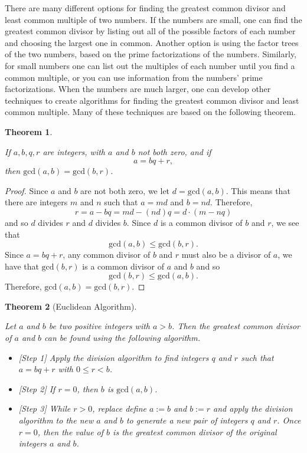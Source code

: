 \documentclass[
]{book}
\providecommand{\tightlist}{%
  \setlength{\itemsep}{0pt}\setlength{\parskip}{0pt}}
\newtheorem{theorem}{Theorem}[chapter]
\theoremstyle{definition}
\theoremstyle{definition}
\theoremstyle{definition}
\theoremstyle{definition}
\theoremstyle{remark}
\begin{document}
There are many different options for finding the greatest common divisor and least common multiple of two numbers. If the numbers are small, one can find the greatest common divisor by listing out all of the possible factors of each number and choosing the largest one in common. Another option is using the factor trees of the two numbers, based on the prime factorizations of the numbers. Similarly, for small numbers one can list out the multiples of each number until you find a common multiple, or you can use information from the numbers' prime factorizations. When the numbers are much larger, one can develop other techniques to create algorithms for finding the greatest common divisor and least common multiple. Many of these techniques are based on the following theorem.

\begin{theorem}
\protect\hypertarget{thm:integers-division-gcd}{}\label{thm:integers-division-gcd}

If \(a,b,q,r\) are integers, with \(a\) and \(b\) not both zero, and if \[a=bq+r,\] then \(\mathrm{gcd}(a,b)=\mathrm{gcd}(b,r)\).

\end{theorem}

\begin{proof}

Since \(a\) and \(b\) are not both zero, we let \(d=\mathrm{gcd}(a,b)\). This means that there are integers \(m\) and \(n\) such that \(a=md\) and \(b=nd\). Therefore,
\[r=a-bq=md-(nd)q = d\cdot (m-nq)\] and so \(d\) divides \(r\) and \(d\) divides \(b\). Since \(d\) is a common divisor of \(b\) and \(r\), we see that \[\mathrm{gcd}(a,b)\leq \mathrm{gcd}(b,r).\] Since \(a=bq+r\), any common divisor of \(b\) and \(r\) must also be a divisor of \(a\), we have that \(\mathrm{gcd}(b,r)\) is a common divisor of \(a\) and \(b\) and so \[\mathrm{gcd}(b,r) \leq \mathrm{gcd}(a,b).\] Therefore, \(\mathrm{gcd}(a,b)=\mathrm{gcd}(b,r)\).

\end{proof}

\begin{theorem}[Euclidean Algorithm]
\protect\hypertarget{thm:unlabeled-div-107}{}\label{thm:unlabeled-div-107}

Let \(a\) and \(b\) be two positive integers with \(a>b\). Then the greatest common divisor of \(a\) and \(b\) can be found using the following algorithm.

\begin{itemize}
\tightlist
\item
  {[}Step 1{]} Apply the division algorithm to find integers \(q\) and \(r\) such that \(a=bq+r\) with \(0\leq r<b\).
\item
  {[}Step 2{]} If \(r=0\), then \(b\) is \(\mathrm{gcd}(a,b)\).
\item
  {[}Step 3{]} While \(r>0\), replace define \(a:=b\) and \(b:=r\) and apply the division algorithm to the new \(a\) and \(b\) to generate a new pair of integers \(q\) and \(r\). Once \(r=0\), then the value of \(b\) is the greatest common divisor of the original integers \(a\) and \(b\).
\end{itemize}

\end{theorem}
\end{document}
